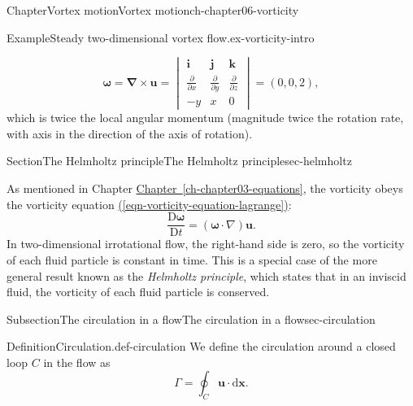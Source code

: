 \documentclass[oneside,10pt,]{book}
\newcommand{\xreffont}{\relax}
\numberwithin{equation}{section}
\newcommand{\de}{\mathrm{d}}
\newcommand{\DD}[2]{\frac{\mathrm{D}#1}{\mathrm{D}#2}}
\newcommand{\pd}[2]{\frac{\partial#1}{\partial#2}}
\newcommand{\bu}{\boldsymbol{u}}
\newcommand{\bomega}{\boldsymbol{\omega}}
\newcommand{\bi}{\boldsymbol{i}}
\newcommand{\bj}{\boldsymbol{j}}
\newcommand{\bk}{\boldsymbol{k}}
\newcommand{\bnabla}{\boldsymbol{\nabla}}
\newcommand{\amp}{&}
\begin{document}
\begin{chapterptx}{Chapter}{Vortex motion}{}{Vortex motion}{}{}{ch-chapter06-vorticity}
\begin{introduction}{}
\begin{example}{Example}{Steady two-dimensional vortex flow.}{ex-vorticity-intro}
\begin{enumerate}
\begin{equation*}
\bomega = \bnabla\times\bu
= \begin{vmatrix}
\bi \amp \bj \amp \bk \\
\pd{}{x} \amp \pd{}{y} \amp \pd{}{z} \\
-y \amp x \amp 0
\end{vmatrix}
= (0,0,2),
\end{equation*}
which is twice the local angular momentum (magnitude twice the rotation rate, with axis in the direction of the axis of rotation).%
\end{enumerate}
%
\end{example}
\end{introduction}%
%
%
\typeout{************************************************}
\typeout{************************************************}
%
\begin{sectionptx}{Section}{The Helmholtz principle}{}{The Helmholtz principle}{}{}{sec-helmholtz}
\begin{introduction}{}%
As mentioned in Chapter \hyperref[ch-chapter03-equations]{Chapter~{\xreffont\ref{ch-chapter03-equations}}}, the vorticity obeys the vorticity equation \hyperref[eqn-vorticity-equation-lagrange]{({\xreffont\ref{eqn-vorticity-equation-lagrange}})}:%
\begin{equation*}
\DD{\bomega}{t} = (\bomega \cdot \nabla)\bu.
\end{equation*}
In two-dimensional irrotational flow, the right-hand side is zero, so the vorticity of each fluid particle is constant in time. This is a special case of the more general result known as the \emph{Helmholtz principle}, which states that in an inviscid fluid, the vorticity of each fluid particle is conserved.%
\end{introduction}%
%
%
\typeout{************************************************}
\typeout{************************************************}
%
\begin{subsectionptx}{Subsection}{The circulation in a flow}{}{The circulation in a flow}{}{}{sec-circulation}
\begin{definition}{Definition}{Circulation.}{def-circulation}%
We define the circulation around a closed loop \(C\) in the flow as%
\begin{equation*}
\Gamma = \oint_C \mathbf{u} \cdot \de\mathbf{x}.
\end{equation*}
%
\end{definition}

\end{subsectionptx}
\end{sectionptx}
\end{chapterptx}
\end{document}
